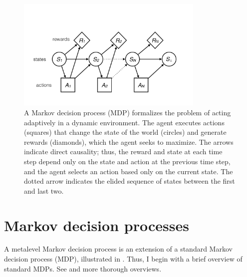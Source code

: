 

\begin{figure}
  \centering
  \includegraphics[width=0.8\textwidth,page=1,trim=0 100 0 200]{diagrams/metamdp.pdf}
  \caption{
    A Markov decision process (MDP) formalizes the problem of acting adaptively in a dynamic environment. The agent executes actions (squares) that change the state of the world (circles) and generate rewards (diamonds), which the agent seeks to maximize. The arrows indicate direct causality; thus, the reward and state at each time step depend only on the state and action at the previous time step, and the agent selects an action based only on the current state. The dotted arrow indicates the elided sequence of states between the first and last two.
  }
  \label{fig:mdp-diagram}
\end{figure}


\section{Markov decision processes}\label{sec:mdps}

A metalevel Markov decision process is an extension of a standard Markov decision process (MDP), illustrated in . Thus, I begin with a brief overview of standard MDPs. See \citet{puterman2014markov} and \citet{sutton2018reinforcement} more thorough overviews.

